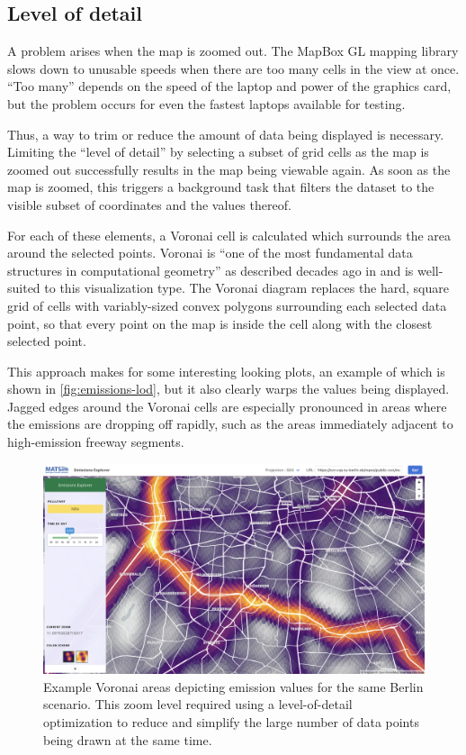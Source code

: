 \hypertarget{server-experiments-emissions-lod}{%
\subsection{Level of detail}
\label{server-experiments-emissions-lod}}

A problem arises when the map is zoomed out. The MapBox GL mapping library slows down to unusable speeds when there are too many cells in the view at once. ``Too many'' depends on the speed of the laptop and power of the graphics card, but the problem occurs for even the fastest laptops available for testing.

Thus, a way to trim or reduce the amount of data being displayed is necessary. Limiting the ``level of detail'' by selecting a subset of grid cells as the map is zoomed out successfully results in the map being viewable again. As soon as the map is zoomed, this triggers a background task that filters the dataset to the visible subset of coordinates and the values thereof.

For each of these elements, a Voronai cell is calculated which surrounds the area around the selected points. Voronai is ``one of the most fundamental data structures in computational geometry'' as described decades ago in \cite{aurenhammer1991voronoi} and is well-suited to this visualization type. The Voronai diagram replaces the hard, square grid of cells with variably-sized convex polygons surrounding each selected data point, so that every point on the map is inside the cell along with the closest selected point.

This approach makes for some interesting looking plots, an example of which is shown in \autoref{fig:emissions-lod}, but it also clearly warps the values being displayed. Jagged edges around the Voronai cells are especially pronounced in areas where the emissions are dropping off rapidly, such as the areas immediately adjacent to high-emission freeway segments.

\begin{figure}[!ht]
  \includegraphics[width=\textwidth]{chapters/12-server-experiments/images/emissions-lod.png}
  \caption[Example Voronai areas depicting emission values for a Berlin scenario]{Example Voronai areas depicting emission values for the same Berlin scenario. This zoom level required using a level-of-detail optimization to reduce and simplify the large number of data points being drawn at the same time.}
  \label{fig:emissions-lod}
\end{figure}

